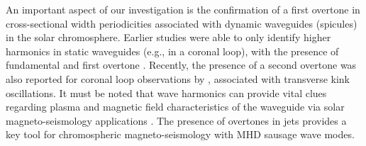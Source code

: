 \documentclass[12pt]{ociamthesis}
\begin{document}
An important aspect of our investigation is the confirmation of a first overtone in cross-sectional width periodicities associated with dynamic waveguides (spicules) in the solar chromosphere.  Earlier studies were able to only identify higher harmonics in static waveguides (e.g., in a coronal loop), with the presence of fundamental and first overtone \citep{verwichte2004, guo2015}. Recently, the presence of a second overtone was also reported for coronal loop observations by \citet{duckenfield2019}, associated with transverse kink oscillations. It must be noted that wave harmonics can provide vital clues regarding plasma and magnetic field characteristics of the waveguide via solar magneto-seismology applications \citep{andries2005,andries2009}. The presence of overtones in jets provides a key tool for chromospheric magneto-seismology with MHD sausage wave modes. 
\end{document}
